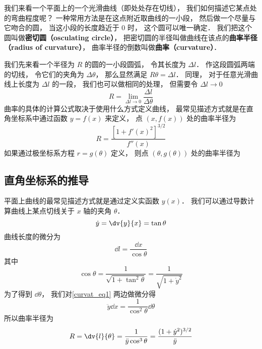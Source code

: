 

我们来看一个平面上的一个光滑曲线（即处处存在切线）， 我们如何描述它某点处的弯曲程度呢？ 一种常用方法是在这点附近取曲线的一小段， 然后做一个尽量与它吻合的圆， 当这小段的长度趋近于 0 时， 这个圆可以唯一确定． 我们把这个圆叫做\textbf{密切圆（osculating circle）}， 把密切圆的半径叫做曲线在该点的\textbf{曲率半径（radius of curvature）}， 曲率半径的倒数叫做\textbf{曲率（curvature）}．

我们先来看一个半径为 $R$ 的圆的一小段圆弧， 令其长度为 $\Delta l$． 作这段圆弧两端的切线， 令它们的夹角为 $\Delta \theta$， 那么显然满足 $R \theta = \Delta l$． 同理， 对于任意光滑曲线上长度为 $\Delta l$ 的一段， 我们也可以做相同的处理， 但需要令 $\Delta l \to 0$
\begin{equation}\label{curvat_eq3}
R = \lim_{\Delta l \to 0} \frac{\Delta l}{\Delta \theta}
\end{equation}
曲率的具体的计算公式取决于使用什么方式定义曲线， 最常见描述方式就是在直角坐标系中通过函数 $y = f(x)$ 来定义， 点 $(x, f(x))$ 处的曲率半径为
\begin{equation}
R = \frac{[1 + f'(x)^2]^{3/2}}{f''(x)}
\end{equation}
如果通过极坐标系方程 $r = g(\theta)$ 定义， 则点 $(\theta, g(\theta))$ 处的曲率半径为
\begin{equation}

\end{equation}


\subsection{直角坐标系的推导}

平面上曲线的最常见描述方式就是通过定义实函数 $y(x)$． 我们可以通过导数计算曲线上某点切线关于 $x$ 轴的夹角 $\theta$．
\begin{equation}\label{curvat_eq1}
\dot y = \dv{y}{x} = \tan \theta
\end{equation}
曲线长度的微分为
\begin{equation}
\dd{l} = \frac{\dd{x}}{\cos\theta}
\end{equation}
其中
\begin{equation}\label{curvat_eq2}
\cos\theta = \frac{1}{\sqrt{1 + \tan^2\theta}} = \frac{1}{\sqrt{1 + \dot y^2}}
\end{equation}
为了得到 $\dd{\theta}$， 我们对\autoref{curvat_eq1} 两边做微分得
\begin{equation}
\ddot y \dd{x} = \frac{1}{\cos^2\theta} \dd{\theta}
\end{equation}
所以曲率半径为
\begin{equation}
R = \dv{l}{\theta} = \frac{1}{\ddot y\cos^3\theta} = \frac{(1 + \dot y^2)^{3/2}}{\ddot y}
\end{equation}

